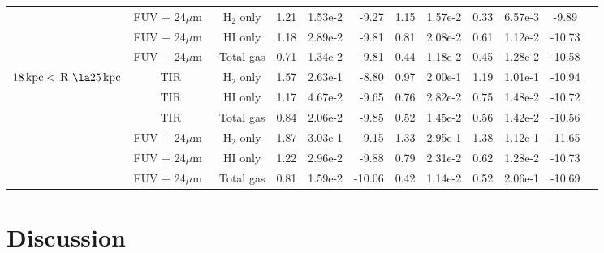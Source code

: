 \documentclass[useAMS,usenatbib]{mn2e}
\newcommand \kpc        {\,{\rm kpc}}
\newcommand \um    {$\mu$m\ }
\begin{document}
\begin{table*}
\begin{tabular}{||cc||cccrcccccr}
 & FUV + 24\um & H$_2$ only & 1.21 & 1.53e-2 & -9.27  & 1.15 & 1.57e-2 & 0.33 & 6.57e-3 & -9.89  \\
 & FUV + 24\um & HI only    & 1.18 & 2.89e-2 & -9.81  & 0.81 & 2.08e-2 & 0.61 & 1.12e-2 & -10.73 \\
 & FUV + 24\um & Total gas  & 0.71 & 1.34e-2 & -9.81  & 0.44 & 1.18e-2  & 0.45 & 1.28e-2  & -10.58 \\
\hline
\multicolumn{1}{||c||}{\multirow{6}{*}{$18\kpc <$ R $\la 25\kpc$}}  & TIR & H$_2$ only & 1.57 & 2.63e-1  & -8.80  & 0.97 & 2.00e-1  & 1.19 & 1.01e-1  & -10.94 \\
 & TIR         & HI only    & 1.17 & 4.67e-2 & -9.65  & 0.76 & 2.82e-2 & 0.75 & 1.48e-2 & -10.72 \\
 & TIR         & Total gas  & 0.84 & 2.06e-2  & -9.85  & 0.52 & 1.45e-2  & 0.56 & 1.42e-2  & -10.56 \\
 & FUV + 24\um & H$_2$ only & 1.87 & 3.03e-1  & -9.15  & 1.33 & 2.95e-1  & 1.38 & 1.12e-1  & -11.65 \\
 & FUV + 24\um & HI only    & 1.22 & 2.96e-2 & -9.88  & 0.79 & 2.31e-2 & 0.62 & 1.28e-2 & -10.73 \\
 & FUV + 24\um & Total gas  & 0.81 & 1.59e-2 & -10.06 & 0.42 & 1.14e-2  & 0.52 & 2.06e-1  & -10.69 \\
 \hline
\end{tabular}
\end{table*}



%
\section{Discussion}

\end{document}
